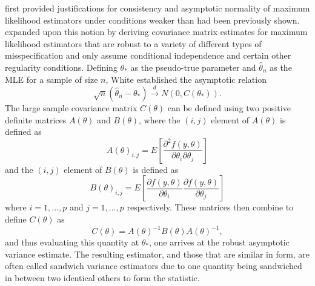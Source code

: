\documentclass[submit]{smj}
\begin{document}
		\citet{Huber} first provided justifications for consistency and asymptotic normality of maximum likelihood estimators under conditions weaker than had been previously shown. \citet{White1982}
		expanded upon this notion by deriving covariance matrix estimates for maximum likelihood estimators that are robust to a variety of different types of misspecification and only assume
		conditional independence and certain other regularity conditions. Defining $\theta_*$ as the pseudo-true parameter and $\hat{\theta}_n$ as the MLE for a sample of size
		$n$, White established the asymptotic relation
		\begin{equation*}
			\sqrt{n} (\hat{\theta}_n - \theta_*) \xrightarrow[]{d} N(0, C(\theta_* ) ) .
		\end{equation*}
		The large sample covariance matrix $C(\theta)$ can be defined using two positive definite matrices $A(\theta)$ and $B(\theta)$, where the $(i,j)$ element of $A(\theta)$ is defined as
		\begin{equation*}
			A(\theta)_{i,j} = E \left[ \frac{\partial^2 f(y,\theta)}{\partial \theta_i \partial \theta_j} \right] 
		\end{equation*}
		and the $(i,j)$ element of $B(\theta)$ is defined as
		\begin{equation*}
			B(\theta)_{i,j} = E \left[ \frac{\partial f(y,\theta)}{\partial \theta_i} \frac{\partial f(y,\theta)}{\partial \theta_j} \right] 
		\end{equation*}
		where $i = 1,...,p$ and $j = 1,...,p$ respectively. These matrices then combine to define $C(\theta)$ as
		\begin{equation*}
			C(\theta) = A(\theta)^{-1} B(\theta) A(\theta)^{-1} ,
		\end{equation*}
		and thus evaluating this quantity at $\theta_*$, one arrives at the robust asymptotic variance estimate. The resulting estimator, and those that are similar in form, are often called sandwich
		variance estimators due to one quantity being sandwiched in between two identical others to form the statistic.
\end{document}
